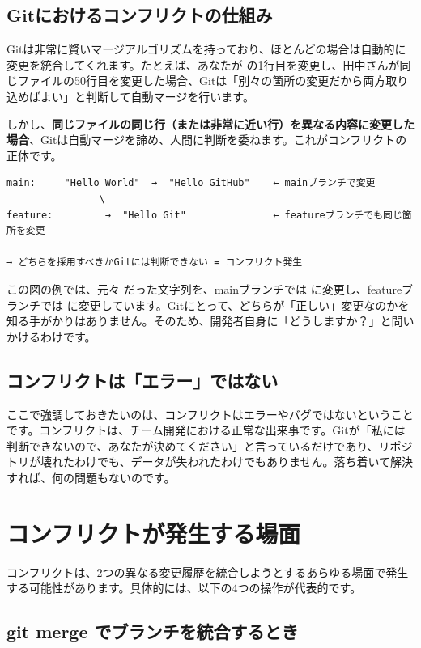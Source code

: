 \subsection{Gitにおけるコンフリクトの仕組み}

Gitは非常に賢いマージアルゴリズムを持っており、ほとんどの場合は自動的に変更を統合してくれます。たとえば、あなたが  の1行目を変更し、田中さんが同じファイルの50行目を変更した場合、Gitは「別々の箇所の変更だから両方取り込めばよい」と判断して自動マージを行います。

しかし、\textbf{同じファイルの同じ行（または非常に近い行）を異なる内容に変更した場合}、Gitは自動マージを諦め、人間に判断を委ねます。これがコンフリクトの正体です。

\begin{lstlisting}[language={}]
main:     "Hello World"  →  "Hello GitHub"    ← mainブランチで変更
                \
feature:         →  "Hello Git"               ← featureブランチでも同じ箇所を変更

→ どちらを採用すべきかGitには判断できない = コンフリクト発生
\end{lstlisting}

この図の例では、元々  だった文字列を、mainブランチでは  に変更し、featureブランチでは  に変更しています。Gitにとって、どちらが「正しい」変更なのかを知る手がかりはありません。そのため、開発者自身に「どうしますか？」と問いかけるわけです。

\subsection{コンフリクトは「エラー」ではない}

ここで強調しておきたいのは、コンフリクトはエラーやバグではないということです。コンフリクトは、チーム開発における正常な出来事です。Gitが「私には判断できないので、あなたが決めてください」と言っているだけであり、リポジトリが壊れたわけでも、データが失われたわけでもありません。落ち着いて解決すれば、何の問題もないのです。

\section{コンフリクトが発生する場面}

コンフリクトは、2つの異なる変更履歴を統合しようとするあらゆる場面で発生する可能性があります。具体的には、以下の4つの操作が代表的です。

\subsection{git merge でブランチを統合するとき}

